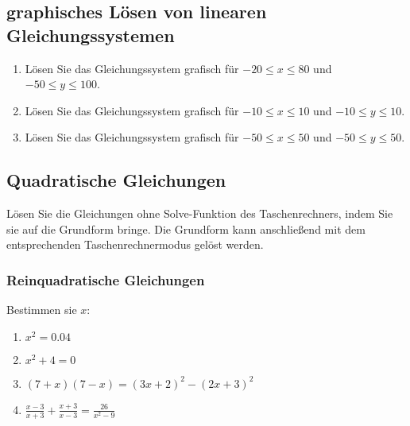   \subsection{graphisches Lösen von linearen Gleichungssystemen}

  \begin{enumerate}
  \item Lösen Sie das Gleichungssystem grafisch für
    $-20 \leq x \leq 80$ und $-50 \leq y \leq 100$.


    \item Lösen Sie das Gleichungssystem grafisch für
      $-10 \leq x \leq 10$ und $-10 \leq y \leq 10$.


          \item Lösen Sie das Gleichungssystem grafisch für
      $-50 \leq x \leq 50$ und $-50 \leq y \leq 50$.


  \end{enumerate}


  \subsection{Quadratische Gleichungen}

  Lösen Sie die Gleichungen ohne Solve-Funktion des Taschenrechners,
  indem Sie sie auf die Grundform bringe. Die Grundform kann
  anschließend mit dem entsprechenden Taschenrechnermodus gelöst
  werden.

  \subsubsection{Reinquadratische Gleichungen}
  Bestimmen sie $x$:
  \begin{multicols}{2}
  \begin{enumerate}
  \item $x^2 = 0.04$
  \item $x^2+4=0$
  \item $(7+x)(7-x)=(3x+2)^2-(2x+3)^2$
    \item $\frac{x-3}{x+3} + \frac{x+3}{x-3} = \frac{26}{x^2-9}$
  \end{enumerate}
  \end{multicols}

